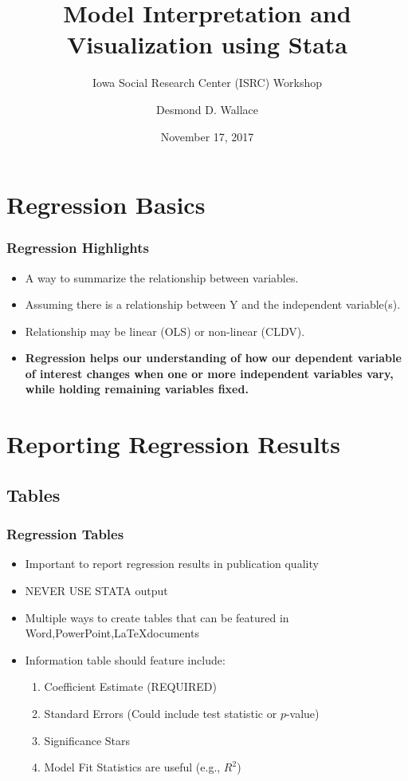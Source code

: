 \documentclass{beamer}
\title[Model Interpretation and Visualization using Stata]{Model Interpretation and Visualization using Stata}
\subtitle[ISRC Workshop]{Iowa Social Research Center (ISRC) Workshop}
\author[Wallace]{Desmond D. Wallace}
\institute[University of Iowa]{Department of Political Science\\The University of Iowa\\Iowa City, IA}
\date{November 17, 2017}
\begin{document}
\begin{frame}
 \titlepage
\end{frame}


\section{Regression Basics}

\begin{frame}
	\frametitle{Regression Highlights}
	\begin{itemize}
		\item A way to summarize the relationship between variables.
		\item Assuming there is a relationship between Y and the independent variable(s).
		\item Relationship may be linear (OLS) or non-linear (CLDV).
		\item \textbf{Regression helps our understanding of how our dependent variable of interest changes when one or more independent variables vary, while holding remaining variables fixed.}
	\end{itemize}
\end{frame}

\section{Reporting Regression Results}
\subsection{Tables}

\begin{frame}
	\frametitle{Regression Tables}
		\begin{itemize}
			\item Important to report regression results in publication quality
			\item NEVER USE STATA output
			\item Multiple ways to create tables that can be featured in Word,PowerPoint,\LaTeX documents
			\item Information table should feature include:
				\begin{enumerate}
					\item Coefficient Estimate (REQUIRED)
					\item Standard Errors (Could include test statistic or $p$-value)
					\item Significance Stars
					\item Model Fit Statistics are useful (e.g., $R^2$)
				\end{enumerate}
		\end{itemize}
\end{frame}
\end{document}
